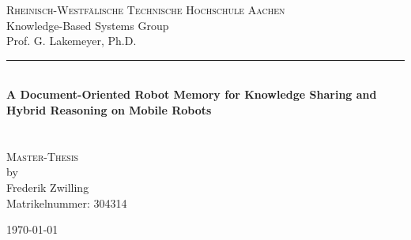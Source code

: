 \begin{titlepage}
  
  \begin{center}
    
    \Large
    \textsc{Rheinisch-Westfälische Technische Hochschule Aachen}\\
    Knowledge-Based Systems Group\\
    Prof. G. Lakemeyer, Ph.D.\\
    
    \vspace{4cm}
    

    \hrule \\
    [0.4cm]
           {
             \Huge 
             \bfseries
             A Document-Oriented Robot Memory for Knowledge Sharing and Hybrid Reasoning on Mobile Robots\\
           }\\
   [0.4cm]
   \hline \\
   [1.5cm]
   
    \textsc{Master-Thesis}\\
    by\\ 
    [0.4cm]
    \large Frederik Zwilling\\
    \normalsize
    Matrikelnummer: 304314\\

    \vspace{7cm}
    
    \today
  \end{center}

\end{titlepage}
